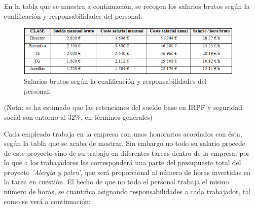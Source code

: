 \documentclass[12pt,oneside,a4paper]{article}
\numberwithin{figure}{section}
\begin{document}
En la tabla que se muestra a continuación, se recogen los salarios brutos según la cualificación y responsabilidades del personal:

\begin{figure}[H]
\begin{center}
\includegraphics[scale=.8]{Presupuesto3.png}
\caption{Salarios brutos según la cualificación y responsabilidades del personal.}
\end{center}
\end{figure}

(Nota: se ha estimado que las retenciones del sueldo base en IRPF y seguridad social son entorno al 32$\%$, en términos generales)

Cada empleado trabaja en la empresa con unos honorarios acordados con ésta, según la tabla que se acaba de mostrar. Sin embargo no todo su salario procede de este proyecto sino de su trabajo en diferentes tareas dentro de la empresa, por lo que a los trabajadores les corresponderá una parte del presupuesto total del proyecto \textit{'Alergia y polen'}, que será proporcional al número de horas invertidas en la tarea en cuestión. El hecho de que no todo el personal trabaja el mismo número de horas, se cuantifica asignando responsabilidades a cada trabajador, tal como se verá a continuación:
\end{document}
